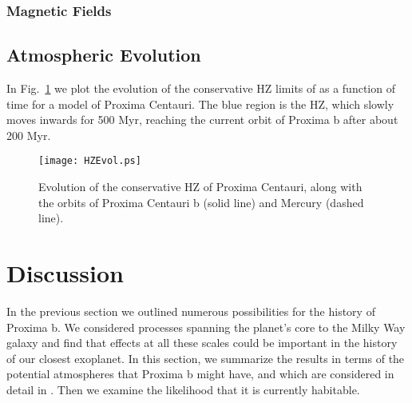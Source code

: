 \documentclass[preprint,12pt]{aastex}
\begin{document}


\subsubsection{Magnetic Fields}
\label{sec:results:magnetic}


\subsection{Atmospheric Evolution}
\label{sec:results:atmesc}

In Fig.~\ref{fig:HZEvol} we plot the evolution of the conservative HZ limits of \cite{Kopparapu13} as a function of time for a model of Proxima Centauri. The blue region is the HZ, which slowly moves inwards for 500 Myr, reaching the current orbit of Proxima b after about 200 Myr.

\begin{figure} 
\begin{center}
\texttt{[image: HZEvol.ps]}
\end{center}
\caption{Evolution of the conservative HZ of Proxima Centauri, along with the orbits of Proxima Centauri b (solid line) and Mercury (dashed line).}
\label{fig:HZEvol}
\end{figure}





\section{Discussion\label{sec:disc}}

In the previous section we outlined numerous possibilities for the history of 
Proxima b. We considered processes spanning the planet's core to the Milky Way 
galaxy and find that effects at all these scales could be important in the history 
of our closest exoplanet. In this section, we summarize the results in terms of 
the potential atmospheres that Proxima b might have, and which are considered 
in detail in \citep{Meadows16}. Then we examine the likelihood that it is currently 
habitable.
\end{document}

